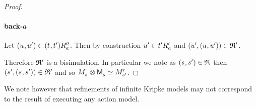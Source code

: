 \begin{proof}
\paragraph{back-$a$}
Let $(\kStateU, \kStateUP) \in \kSuccessorsPPA{(\kStateT, \kStateTP)}$.
Then by construction ${u}^{\prime} \in {{t}^{\prime}} {R^{\prime}_{a}}$ and $(\kStateUP, (\kStateU, \kStateUP)) \in \bisimulation'$.

Therefore $\mathfrak{R}'$ is a bisimulation.
In particular we note as $(\kStateS, \kStateSP) \in \refinement$ then $(\kStateSP, (\kStateS, \kStateSP)) \in \bisimulation'$ and so $\kPModel{\kStateS} \exec \aPModel{\aStateS} \bisimilar \kPModelP{\kStateSP}$.
\end{proof}

We note however that refinements of infinite Kripke models may not correspond to the result of executing any action model.

